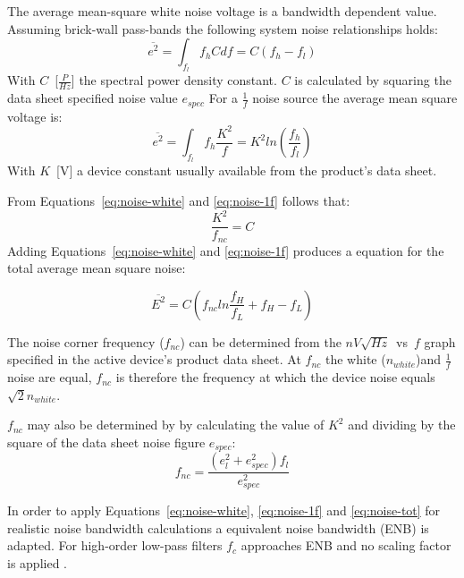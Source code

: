 The average mean-square white noise voltage is a bandwidth dependent
value. Assuming brick-wall pass-bands the following system noise
relationships holds:
\begin{equation}
	\overline{e^2} = \int_{f_l}{f_h}Cdf = C(f_h - f_l) 	
	\label{eq:noise-white}
\end{equation}
With $C$~[$\frac{P}{Hz}$] the spectral power density constant. $C$ is
calculated by squaring the data sheet specified noise value $e_{spec}$
For a $\frac{1}{f}$ noise source the average mean square voltage is:
\begin{equation}
	\overline{e^2} = \int_{f_l}{f_h}\frac{K^2}{f} = K^2ln(\frac{f_h}{f_l}) 	
	\label{eq:noise-1f}
\end{equation}
With $K$~[V] a device constant usually available from the product's
data sheet.

From Equations~\ref{eq:noise-white} and \ref{eq:noise-1f} follows
that:
\begin{equation}
	\frac{K^2}{f_{nc}} = C	
\end{equation}
Adding Equations~\ref{eq:noise-white} and \ref{eq:noise-1f} produces a
equation for the total average mean square noise:

\begin{equation}
	\overline{E^2} = C(f_{nc}ln\frac{f_H}{f_L} + f_{H} - f_{L})
	\label{eq:noise-tot}
\end{equation}

The noise corner frequency ($f_{nc}$) can be determined from the
$nV\sqrt{Hz}$~vs~$f$ graph specified in the active device's product
data sheet. At $f_{nc}$ the white ($n_{white}$)and $\frac{1}{f}$ noise
are equal, $f_{nc}$ is therefore the frequency at which the device
noise equals $\sqrt{2}n_{white}$.

$f_{nc}$ may also be determined by by calculating the value of $K^2$
and dividing by the square of the data sheet noise figure $e_{spec}$:
\begin{equation}
	f_{nc} = \frac{(e_{l}^2 + e_{spec}^2)f_l}{e_{spec}^2}
\end{equation}

In order to apply Equations~\ref{eq:noise-white}, \ref{eq:noise-1f}
and \ref{eq:noise-tot} for realistic noise bandwidth calculations a
equivalent noise bandwidth (ENB) is adapted. For high-order low-pass
filters $f_c$ approaches ENB and no scaling factor is applied
\cite[p10]{noise-analysis}.


